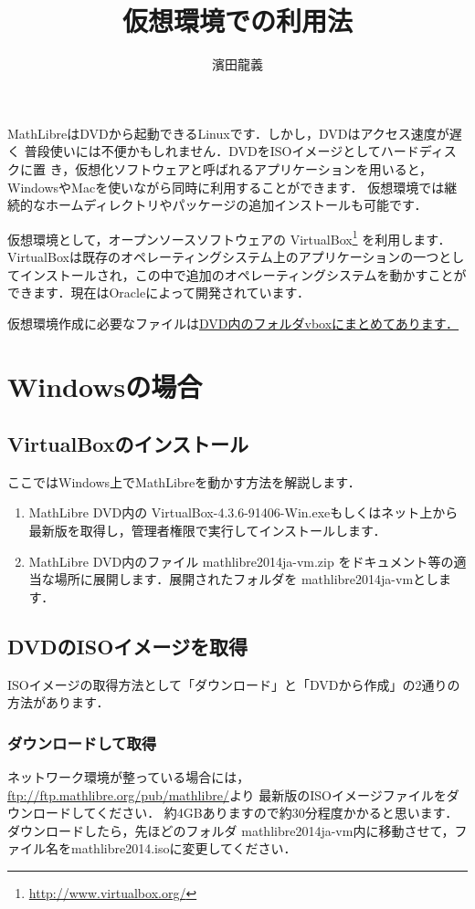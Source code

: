 \documentclass[a4j]{jsarticle}
\title{仮想環境での利用法}
\author{濱田龍義}
\newcommand{\vboxwin}{VirtualBox-4.3.6-91406-Win.exe}
\newcommand{\vm}{mathlibre2014ja-vm}
\begin{document}
\maketitle
MathLibreはDVDから起動できるLinuxです．しかし，DVDはアクセス速度が遅く
普段使いには不便かもしれません．DVDをISOイメージとしてハードディスクに置
き，仮想化ソフトウェアと呼ばれるアプリケーションを用いると，
WindowsやMacを使いながら同時に利用することができます．
仮想環境では継続的なホームディレクトリやパッケージの追加インストールも可能です．

仮想環境として，オープンソースソフトウェアの VirtualBox\footnote{\url{http://www.virtualbox.org/}} を利用します．
VirtualBoxは既存のオペレーティングシステム上のアプリケーションの一つとし
てインストールされ，この中で追加のオペレーティングシステムを動かすことが
できます．現在はOracleによって開発されています．

仮想環境作成に必要なファイルは\underline{DVD内のフォルダvboxにまとめてあります．}

\section{Windowsの場合}
\subsection{VirtualBoxのインストール}
ここではWindows上でMathLibreを動かす方法を解説します．
\begin{enumerate}
 \item MathLibre DVD内の \vboxwin もしくはネット上から最新版を取得し，管理者権限で実行してインストールします．
 \item MathLibre DVD内のファイル \vm.zip をドキュメント等の適当な場所に展開します．展開されたフォルダを \vm とします．
\end{enumerate}

\subsection{DVDのISOイメージを取得}
ISOイメージの取得方法として「ダウンロード」と「DVDから作成」の2通りの方法があります．
\subsubsection{ダウンロードして取得}
ネットワーク環境が整っている場合には，
\url{ftp://ftp.mathlibre.org/pub/mathlibre/}より
最新版のISOイメージファイルをダウンロードしてください．
約4GBありますので約30分程度かかると思います．
ダウンロードしたら，先ほどのフォルダ \vm 内に移動させて，ファイル名をmathlibre2014.isoに変更してください．
\end{document}
